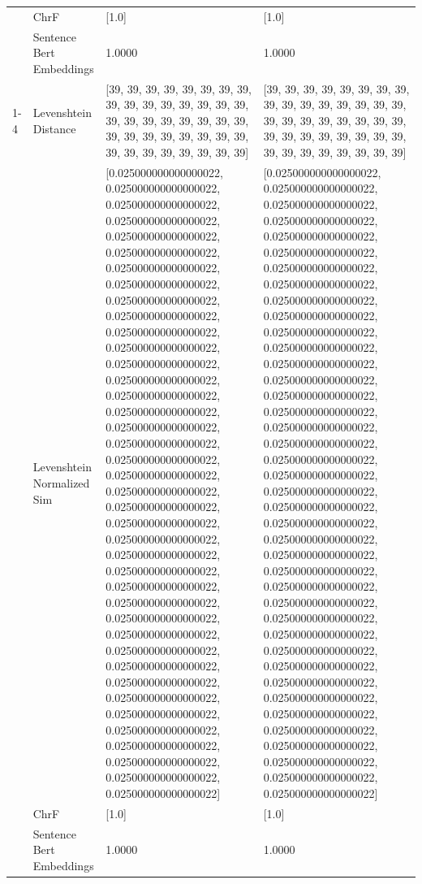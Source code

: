 \begin{tabular}{llll}
 & ChrF & [1.0] & [1.0] \\
 & Sentence Bert Embeddings & 1.0000 & 1.0000 \\
\cline{1-4}
\multirow[t]{4}{*}{Obomonto tiri ogotwara oboigoro bwao.} & Levenshtein Distance & [39, 39, 39, 39, 39, 39, 39, 39, 39, 39, 39, 39, 39, 39, 39, 39, 39, 39, 39, 39, 39, 39, 39, 39, 39, 39, 39, 39, 39, 39, 39, 39, 39, 39, 39, 39, 39, 39, 39, 39] & [39, 39, 39, 39, 39, 39, 39, 39, 39, 39, 39, 39, 39, 39, 39, 39, 39, 39, 39, 39, 39, 39, 39, 39, 39, 39, 39, 39, 39, 39, 39, 39, 39, 39, 39, 39, 39, 39, 39, 39] \\
 & Levenshtein Normalized Sim & [0.025000000000000022, 0.025000000000000022, 0.025000000000000022, 0.025000000000000022, 0.025000000000000022, 0.025000000000000022, 0.025000000000000022, 0.025000000000000022, 0.025000000000000022, 0.025000000000000022, 0.025000000000000022, 0.025000000000000022, 0.025000000000000022, 0.025000000000000022, 0.025000000000000022, 0.025000000000000022, 0.025000000000000022, 0.025000000000000022, 0.025000000000000022, 0.025000000000000022, 0.025000000000000022, 0.025000000000000022, 0.025000000000000022, 0.025000000000000022, 0.025000000000000022, 0.025000000000000022, 0.025000000000000022, 0.025000000000000022, 0.025000000000000022, 0.025000000000000022, 0.025000000000000022, 0.025000000000000022, 0.025000000000000022, 0.025000000000000022, 0.025000000000000022, 0.025000000000000022, 0.025000000000000022, 0.025000000000000022, 0.025000000000000022, 0.025000000000000022] & [0.025000000000000022, 0.025000000000000022, 0.025000000000000022, 0.025000000000000022, 0.025000000000000022, 0.025000000000000022, 0.025000000000000022, 0.025000000000000022, 0.025000000000000022, 0.025000000000000022, 0.025000000000000022, 0.025000000000000022, 0.025000000000000022, 0.025000000000000022, 0.025000000000000022, 0.025000000000000022, 0.025000000000000022, 0.025000000000000022, 0.025000000000000022, 0.025000000000000022, 0.025000000000000022, 0.025000000000000022, 0.025000000000000022, 0.025000000000000022, 0.025000000000000022, 0.025000000000000022, 0.025000000000000022, 0.025000000000000022, 0.025000000000000022, 0.025000000000000022, 0.025000000000000022, 0.025000000000000022, 0.025000000000000022, 0.025000000000000022, 0.025000000000000022, 0.025000000000000022, 0.025000000000000022, 0.025000000000000022, 0.025000000000000022, 0.025000000000000022] \\
 & ChrF & [1.0] & [1.0] \\
 & Sentence Bert Embeddings & 1.0000 & 1.0000 \\

\end{tabular}

